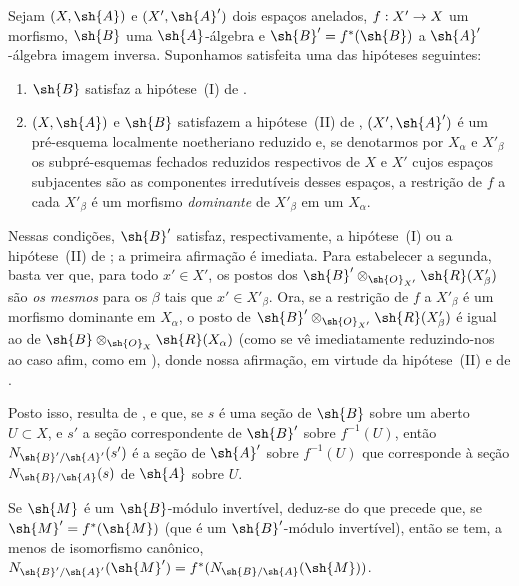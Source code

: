 \documentclass[oneside,10pt]{amsart}
\makeatletter
\newcommand{\ega@arrow}[2]{\mathchoice{#1}{#2}{#2}{#2}}
\renewcommand{\to}{\ega@arrow{\longrightarrow}{\rightarrow}}
\newcommand{\oldpage}[2][]{\marginnote{\normalfont\footnotesize\textbf{#1}~|~#2}\ignorespaces}
\let\EGAOriginalLabel\label
\renewcommand{\label}[1]{\phantomsection\EGAOriginalLabel{#1}}
\makeatother
\begin{document}
\begin{env}[6.5.4]
\label{II.6.5.4}
Sejam $(X,\sh{A})$ e $(X',\sh{A}')$ dois espaços anelados, $f:X'\to X$ um morfismo, $\sh{B}$ uma $\sh{A}$-álgebra e $\sh{B}'=f^*(\sh{B})$ a $\sh{A}'$-álgebra imagem inversa.
Suponhamos satisfeita uma das hipóteses seguintes:
\begin{enumerate}
  \item $\sh{B}$ satisfaz a hipótese~(I) de .
  \item $(X,\sh{A})$ e $\sh{B}$ satisfazem a hipótese~(II) de , $(X',\sh{A}')$ é um pré-esquema localmente noetheriano reduzido e, se denotarmos por $X_\alpha$ e $X'_\beta$ os subpré-esquemas fechados reduzidos respectivos de $X$ e $X'$ cujos espaços subjacentes são as componentes irredutíveis desses espaços, a restrição de $f$ a cada $X'_\beta$ é um morfismo \emph{dominante} de $X'_\beta$ em um $X_\alpha$.
\end{enumerate}

Nessas condições, $\sh{B}'$ satisfaz, respectivamente, a hipótese~(I) ou a hipótese~(II) de ;
a primeira afirmação é imediata.
Para estabelecer a segunda, basta ver que, para todo $x'\in X'$, os postos dos $\sh{B}'\otimes_{\sh{O}_{X'}}\sh{R}(X'_\beta)$ são \emph{os mesmos} para os $\beta$ tais que $x'\in X'_\beta$.
Ora, se a restrição de $f$ a $X'_\beta$ é um morfismo dominante em $X_\alpha$, o posto de $\sh{B}'\otimes_{\sh{O}_{X'}}\sh{R}(X'_\beta)$ é igual ao de $\sh{B}\otimes_{\sh{O}_X}\sh{R}(X_\alpha)$ (como se vê imediatamente reduzindo-nos ao
\oldpage[II]{129}
caso afim, como em ), donde nossa afirmação, em virtude da hipótese~(II) e de .

Posto isso, resulta de ,  e  que, se $s$ é uma seção de $\sh{B}$ sobre um aberto $U\subset X$, e $s'$ a seção correspondente de $\sh{B}'$ sobre $f^{-1}(U)$, então $N_{\sh{B}'/\sh{A}'}(s')$ é a seção de $\sh{A}'$ sobre $f^{-1}(U)$ que corresponde à seção $N_{\sh{B}/\sh{A}}(s)$ de $\sh{A}$ sobre $U$.

Se $\sh{M}$ é um $\sh{B}$-módulo invertível, deduz-se do que precede que, se $\sh{M}'=f^*(\sh{M})$ (que é um $\sh{B}'$-módulo invertível), então se tem, a menos de isomorfismo canônico, $N_{\sh{B}'/\sh{A}'}(\sh{M}')=f^*(N_{\sh{B}/\sh{A}}(\sh{M}))$.
\end{env}
\end{document}

